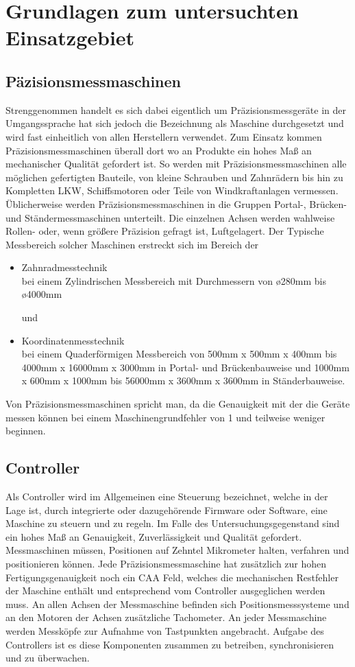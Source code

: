 \section{Grundlagen zum untersuchten Einsatzgebiet}
\subsection{Päzisionsmessmaschinen}
Strenggenommen handelt es sich dabei eigentlich um Präzisionsmessgeräte in der Umgangssprache hat sich jedoch die Bezeichnung als Maschine durchgesetzt und wird fast einheitlich von allen Herstellern verwendet. Zum Einsatz kommen Präzisionsmessmaschinen überall dort wo an Produkte ein hohes Maß an mechanischer Qualität gefordert ist. So werden mit Präzisionsmessmaschinen alle möglichen gefertigten Bauteile, von kleine Schrauben und Zahnrädern bis hin zu Kompletten LKW, Schiffsmotoren oder Teile von Windkraftanlagen vermessen. Üblicherweise werden Präzisionsmessmaschinen in die Gruppen Portal-, Brücken- und Ständermessmaschinen unterteilt. Die einzelnen Achsen werden wahlweise Rollen- oder, wenn größere Präzision gefragt ist, Luftgelagert. Der Typische Messbereich solcher Maschinen erstreckt sich im Bereich der
\begin{itemize}
\item Zahnradmesstechnik \\
bei einem Zylindrischen Messbereich mit Durchmessern von \o 280mm bis \o 4000mm

und
\item Koordinatenmesstechnik \\ 
bei einem Quaderförmigen Messbereich von 500mm x 500mm x 400mm bis 4000mm x 16000mm x 3000mm in Portal- und Brückenbauweise und 1000mm x 600mm x 1000mm bis 56000mm x 3600mm x 3600mm in Ständerbauweise.
\end{itemize}

Von Präzisionsmessmaschinen spricht man, da die Genauigkeit mit der die Geräte messen können bei einem Maschinengrundfehler von 1\textmu{  } und teilweise weniger beginnen. 


\subsection{Controller}
Als Controller wird im Allgemeinen eine Steuerung bezeichnet, welche in der Lage ist, durch integrierte oder dazugehörende Firmware oder Software, eine Maschine zu steuern und zu regeln.
Im Falle des Untersuchungsgegenstand sind ein hohes Maß an Genauigkeit, Zuverlässigkeit und Qualität gefordert. Messmaschinen müssen, Positionen auf Zehntel Mikrometer halten, verfahren und positionieren können. Jede Präzisionsmessmaschine hat zusätzlich zur hohen Fertigungsgenauigkeit noch ein CAA Feld, welches die mechanischen Restfehler der Maschine enthält und entsprechend vom Controller ausgeglichen werden muss. An allen Achsen der Messmaschine befinden sich Positionsmesssysteme und an den Motoren der Achsen zusätzliche Tachometer. An jeder Messmaschine werden Messköpfe zur Aufnahme von Tastpunkten angebracht. Aufgabe des Controllers ist es diese Komponenten zusammen zu betreiben, synchronisieren und zu überwachen.

